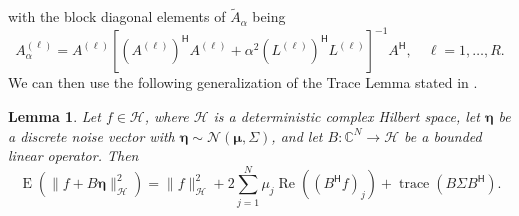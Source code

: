 \documentclass[12pt]{article}
\newcommand{\ctrans}[1]{{#1}^\mathsf{H}}	%
\DeclareMathOperator{\trace}{trace}		%
\newcommand{\regparam}{\alpha}
\newcommand{\noise}{\eta}	%
\newcommand{\noiseVec}{\bm{\noise}}	%
\DeclareMathOperator{\E}{E}	%
\renewcommand{\Re}{\operatorname{Re}}	%
\newcommand{\A}{A_{\regparam}}	%
\newtheorem{lemma}{Lemma}[section]
\begin{document}
with the block diagonal elements of $\widetilde{A}_\regparam$ being 
\begin{equation}
\label{eq:Influence matrix}
\A^{(\ell)} = A^{(\ell)}[\ctrans{(A^{(\ell)})}A^{(\ell)} + \regparam^2\ctrans{(L^{(\ell)})}L^{(\ell)}]^{-1}\ctrans{A}, \quad \ell = 1,\ldots,R.
\end{equation} We can then use the following generalization of the Trace Lemma stated in \cite[p.~98]{Vogel:2002}.
\begin{lemma}
\label{lem:Generalized Trace Lemma}
Let $f \in \mathcal{H}$, where $\mathcal{H}$ is a deterministic complex Hilbert space, let $\noiseVec$ be a discrete noise vector with $\noiseVec \sim \mathcal{N}(\bm{\mu},\Sigma)$, and let $B: \mathbb{C}^N \rightarrow  \mathcal{H}$ be a bounded linear operator. Then
\[\E(\|f + B\noiseVec\|_{\mathcal{H}}^2) = \|f\|_{\mathcal{H}}^2 + 2\sum_{j=1}^{N} \mu_j\Re((\ctrans{B}f)_j) + \trace\left(B\Sigma\ctrans{B}\right).\]
\end{lemma}
\end{document}
